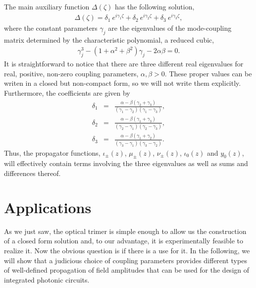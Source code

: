 \documentclass[9pt,twocolumn,twoside]{osajnl}
\begin{document}
The main auxiliary function $\Delta(\zeta)$ has the following solution,
\begin{eqnarray}
\Delta(\zeta) = \delta_{1} \: e^{i \gamma_1 \zeta} + \delta_{2} \: e^{i \gamma_2 \zeta} +  \delta_{3} \: e^{i \gamma_3 \zeta},
\end{eqnarray}  
where the constant parameters  $\gamma_{j}$ are the eigenvalues of the mode-coupling matrix determined by the characteristic polynomial, a reduced cubic,
\begin{eqnarray}
\gamma_{j}^{3} - (1+ \alpha^{2} + \beta^{2}) \gamma_{j} - 2 \alpha \beta = 0. \label{eq:poly}
\end{eqnarray}
It is straightforward to notice that there are three different real eigenvalues for real, positive, non-zero coupling parameters, $\alpha, \beta > 0$.
These proper values can be writen in a closed but non-compact form, so we will not write them explicitly.
Furthermore, the coefficients are given by
\begin{eqnarray}
\delta_{1} &=& \frac{\alpha-\beta(\gamma_2+\gamma_3)}{(\gamma_1-\gamma_2)(\gamma_1-\gamma_3)},\\
\delta_{2} &=& \frac{\alpha-\beta(\gamma_1+\gamma_3)}{(\gamma_2-\gamma_1)(\gamma_2-\gamma_3)},\\
\delta_{3} &=& \frac{\alpha-\beta(\gamma_1+\gamma_2)}{(\gamma_3-\gamma_1)(\gamma_3-\gamma_2)}. 
\end{eqnarray}  
Thus, the propagator functions, $\iota_{\pm}(z)$, $\mu_{\pm}(z)$, $\nu_{\pm}(z)$, $\iota_{0}(z)$ and $y_{0}(z)$, will effectively contain terms involving the three eigenvalues as well as sums and differences thereof.



\section{Applications}

As we just saw, the optical trimer is simple enough to allow us the construction of a closed form solution and, to our advantage, it is experimentally feasible to realize it.
Now the obvious question is if there is a use for it.
In the following, we will show that a judicious choice of coupling parameters provides  different types of well-defined propagation of field amplitudes that can be used for the design of integrated photonic circuits.
\end{document}
